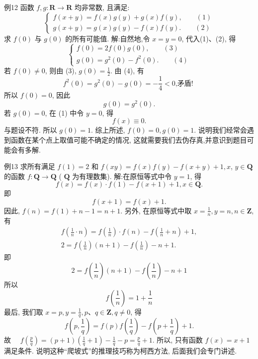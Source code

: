 例12 函数 $f, g: \mathbf{R} \rightarrow \mathbf{R}$ 均非常数, 且满足:
$$
\left\{\begin{array}{l}
f(x+y)=f(x) g(y)+g(x) f(y), \quad\quad (1)\\
g(x+y)=g(x) g(y)-f(x) f(y) .\quad\quad (2)
\end{array}\right.
$$
求 $f(0)$ 与 $g(0)$ 的所有可能值.
解:自然地,令 $x=y=0$, 代入(1)、(2), 得
$$
\left\{\begin{array}{l}
f(0)=2 f(0) g(0), \quad\quad (3)\\
g(0)=g^2(0)-f^2(0) . \quad\quad (4)
\end{array}\right.
$$
若 $f(0) \neq 0$, 则由 (3), $g(0)=\frac{1}{2}$. 由 (4), 有
$$
f^2(0)=g^2(0)-g(0)=-\frac{1}{4}<0 \text {,矛盾! }
$$
所以 $f(0)=0$, 因此
$$
g(0)=g^2(0) .
$$
若 $g(0)=0$, 在 (1) 中令 $y=0$, 得
$$
f(x) \equiv 0 .
$$
与题设不符.
所以 $g(0)=1$.
综上所述, $f(0)=0, g(0)=1$.
说明我们经常会遇到函数在某个点上取值可能不确定的情况, 这就需要我们去伪存真,并意识到题目可能会有多解.



例13 求所有满足 $f(1)=2$ 和 $f(x y)=f(x) f(y)-f(x+y)+1, x$, $y \in \mathbf{Q}$ 的函数 $f: \mathbf{Q} \rightarrow \mathbf{Q}$ ( $\mathbf{Q}$ 为有理数集).
解:在原恒等式中令 $y=1$, 得
$$
f(x)=f(x) \cdot f(1)-f(x+1)+1, x \in \mathbf{Q} .
$$
即
$$
f(x+1)=f(x)+1 .
$$
因此, $f(n)=f(1)+n-1=n+1$.
另外, 在原恒等式中取 $x=\frac{1}{n}, y=n, n \in \mathbf{Z}$, 有
$$
\begin{gathered}
f\left(\frac{1}{n} \cdot n\right)=f\left(\frac{1}{n}\right) \cdot f(n)-f\left(\frac{1}{n}+n\right)+1, \\
2=f\left(\frac{1}{n}\right)(n+1)-f\left(\frac{1}{n}\right)-n+1 .
\end{gathered}
$$
即
$$
2=f\left(\frac{1}{n}\right)(n+1)-f\left(\frac{1}{n}\right)-n+1
$$
所以
$$
f\left(\frac{1}{n}\right)=1+\frac{1}{n}
$$
最后, 我们取 $x=p, y=\frac{1}{q}, p 、 q \in \mathbf{Z}, q \neq 0$, 得
$$
f\left(p, \frac{1}{q}\right)=f(p) f\left(\frac{1}{q}\right)-f\left(p+\frac{1}{q}\right)+1 .
$$
故 $\quad f\left(\frac{p}{q}\right)=(p+1)\left(\frac{1}{q}+1\right)-\frac{1}{q}-p=\frac{p}{q}+1$.
所以, 只有函数 $f(x)=x+1$ 满足条件.
说明这种“爬坡式”的推理技巧称为柯西方法, 后面我们会专门讲述.



